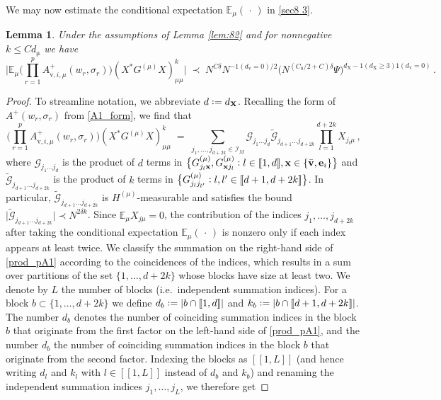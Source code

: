 \documentclass[11pt]{article} %
\numberwithin{equation}{section}
\numberwithin{figure}{section}
\theoremstyle{plain} %
\newtheorem{lemma}[theorem]{Lemma}
\theoremstyle{definition} %
\newcommand{\f}[1]{\boldsymbol{\mathrm{#1}}} %
\renewcommand{\cal}{\mathcal}
\newcommand{\wt}{\widetilde}
\newcommand{\E}{\mathbb{E}}
\newcommand{\col}{\mathrel{\vcenter{\baselineskip0.75ex \lineskiplimit0pt \hbox{.}\hbox{.}}}}
\newcommand*{\deq}{\mathrel{\vcenter{\baselineskip0.65ex \lineskiplimit0pt \hbox{.}\hbox{.}}}=}
\renewcommand{\leq}{\leqslant}
\renewcommand{\geq}{\geqslant}
\newcommand{\qq}[1]{[\![{#1}]\!]}
\newcommand{\ind}[1]{\f 1 (#1)}
\newcommand{\pb}[1]{\bigl({#1}\bigr)}
\newcommand{\pBB}[1]{\Biggl({#1}\Biggr)}
\newcommand{\hb}[1]{\bigl\{{#1}\bigr\}}
\newcommand{\abs}[1]{\lvert #1 \rvert}
\newcommand{\absb}[1]{\bigl\lvert #1 \bigr\rvert}
\newcommand{\absBB}[1]{\Biggl\lvert #1 \Biggr\rvert}
\begin{document}
We may now estimate the conditional expectation $\E_\mu(\, \cdot\,)$ in \eqref{sec8 3}.
\begin{lemma} \label{lem:87}
Under the assumptions of Lemma \ref{lem:82} and for nonnegative $k \leq C d_{\f \mu}$ we have
\begin{equation} \label{lem_87_est}
\absBB{\E_\mu \pBB{\prod_{r = 1}^{p} A_{\f v,i,\mu}^+(w_r, \sigma_r)} (X^* G^{(\mu)} X)_{\mu \mu}^k} \;\prec\; N^{C \delta} N^{-\ind{d_{\f v} = 0}/2} \pb{N^{(C_0/2 + C) \delta} \Psi}^{d_{\f X} - \ind{d_{\f X} \geq 3} \ind{d_{\f v} = 0}}\,.
\end{equation}
\end{lemma}
\begin{proof}

To streamline notation, we abbreviate $d \deq d_{\f X}$.
Recalling the form of $A^+(w_r,\sigma_r)$ from \eqref{A1_form}, we find that
\begin{equation} \label{prod_pA1}
\pBB{\prod_{r = 1}^{p} A^+_{\f v, i,\mu}(w_r, \sigma_r)} (X^* G^{(\mu)} X)_{\mu \mu}^k \;=\; \sum_{j_1, \dots, j_{d + 2k} \in \cal I_M} \cal G_{j_1 \dots j_d} \wt {\cal G}_{j_{d+1} \dots j_{d + 2k}}  \prod_{l = 1}^{d + 2 k} X_{j_l \mu}\,,
\end{equation}
where $\cal G_{j_1 \dots j_d}$ is the product of $d$ terms in $\hb{G^{(\mu)}_{j_l \f x}, G^{(\mu)}_{\f x j_l} \col l \in \qq{1,d}, \f x \in \{\bar{\f v},\f e_i\}}$ and $\wt {\cal G}_{j_{d+1} \dots j_{d + 2k}}$ is the product of $k$ terms in $\hb{G^{(\mu)}_{j_{l} j_{l'}} \col l,l' \in \qq{d+1, d + 2k}}$. In particular, $\wt {\cal G}_{j_{d+1} \dots j_{d + 2k}}$ is $H^{(\mu)}$-measurable and satisfies the bound $\absb{\wt {\cal G}_{j_{d+1} \dots j_{d + 2k}}} \prec N^{2 \delta k}$.
Since $\E_\mu X_{j \mu} = 0$, the contribution of the indices $j_1, \dots, j_{d + 2k}$ after taking the conditional expectation $\E_\mu(\, \cdot\,)$ is nonzero only if each index appears at least twice. We classify the summation on the right-hand side of \eqref{prod_pA1} according to the coincidences of the indices, which results in a sum over partitions of the set $\{1, \dots, d + 2k\}$ whose blocks have size at least two. We denote by $L$ the number of blocks (i.e.\ independent summation indices). For a block $b \subset \{1, \dots, d + 2k\}$ we define $d_b \deq \abs{b \cap \qq{1,d}}$ and $k_b \deq \abs{b \cap \qq{d+1, d+2k}}$. The number $d_b$ denotes the number of coinciding summation indices in the block $b$ that originate from the first factor on the left-hand side of \eqref{prod_pA1}, and the number $d_b$ the number of coinciding summation indices in the block $b$ that originate from the second factor. Indexing the blocks as $\qq{1,L}$ (and hence writing $d_l$ and $k_l$ with $l \in \qq{1,L}$ instead of $d_b$ and $k_b$) and renaming the independent summation indices $j_1, \dots, j_L$, we therefore get

\end{proof}
\end{document}
